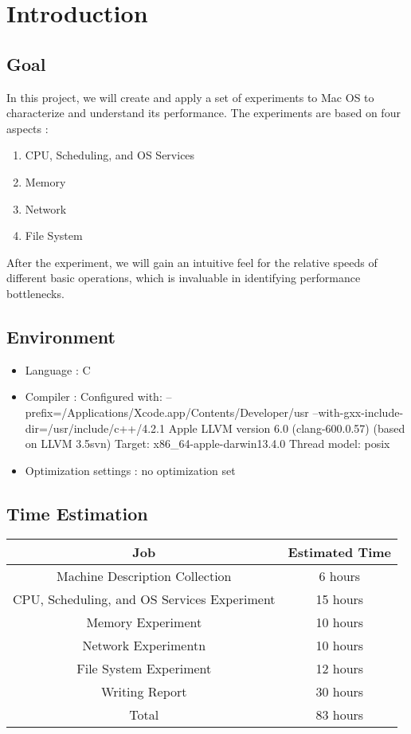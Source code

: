 \chapter{Introduction}
\label{cha:intro}


\section{Goal}
In this project, we will create and apply a set of experiments to Mac OS to characterize and understand its performance. The experiments are based on four aspects : 
\begin{enumerate}
\item CPU, Scheduling, and OS Services
\item Memory
\item Network
\item File System
\end{enumerate}


After the experiment, we will gain an intuitive feel for the relative speeds of different basic operations, which is invaluable in identifying performance bottlenecks.

\section{Environment}

\begin{itemize}
\item Language : C
\item Compiler : Configured with: --prefix=/Applications/Xcode.app/Contents/Developer/usr --with-gxx-include-dir=/usr/include/c++/4.2.1
Apple LLVM version 6.0 (clang-600.0.57) (based on LLVM 3.5svn)
Target: x86\_64-apple-darwin13.4.0
Thread model: posix
\item Optimization settings : no optimization set
\end{itemize}

\section{Time Estimation}
\begin{center}
\begin{tabular}{| c | c |}
\hline
Job &  Estimated Time   \\

\hline
Machine Description Collection & 6 hours \\  \hline
CPU, Scheduling, and OS Services Experiment & 15 hours \\  \hline
Memory Experiment & 10 hours \\  \hline
Network Experimentn & 10 hours \\  \hline
File System Experiment & 12 hours \\  \hline
Writing Report & 30 hours \\  \hline
Total & 83 hours \\  \hline

\end{tabular}
\end{center}
